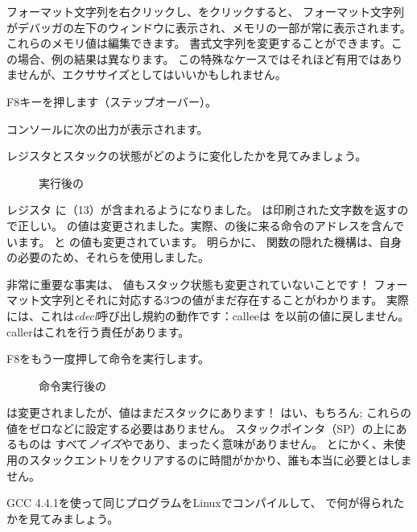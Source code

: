 フォーマット文字列を右クリックし、をクリックすると、
フォーマット文字列がデバッガの左下のウィンドウに表示され、メモリの一部が常に表示されます。 
これらのメモリ値は編集できます。 
書式文字列を変更することができます。この場合、例の結果は異なります。 
この特殊なケースではそれほど有用ではありませんが、エクササイズとしてはいいかもしれません。

\clearpage
F8キーを押します（ステップオーバー）。

コンソールに次の出力が表示されます。



レジスタとスタックの状態がどのように変化したかを見てみましょう。

\begin{figure}[H]
\centering
{}
\caption{\printf{} 実行後の \olly }
\label{fig:printf3_olly_3}
\end{figure}

レジスタ \EAX に（13）が含まれるようになりました。 
\printf は印刷された文字数を返すので正しい。 
\EIP の値は変更されました。実際、の後に来る命令のアドレスを含んでいます。 
\ECX と \EDX の値も変更されています。 
明らかに、 \printf 関数の隠れた機構は、自身の必要のため、それらを使用しました。

非常に重要な事実は、 \ESP 値もスタック状態も変更されていないことです！
フォーマット文字列とそれに対応する3つの値がまだ存在することがわかります。
実際には、これは\emph{cdecl}呼び出し規約の動作です：\gls{callee}は \ESP を以前の値に戻しません。 
\gls{caller}はこれを行う責任があります。

\clearpage
F8をもう一度押して命令を実行します。

\begin{figure}[H]
\centering
{}
\caption{命令実行後の \olly }
\label{fig:printf3_olly_4}
\end{figure}

\ESP は変更されましたが、値はまだスタックにあります！ 
はい、もちろん; これらの値をゼロなどに設定する必要はありません。 
スタックポインタ（\ac{SP}）の上にあるものは
すべて\emph{ノイズ}や\emph{\garbage{}}であり、まったく意味がありません。
とにかく、未使用のスタックエントリをクリアするのに時間がかかり、誰も本当に必要とはしません。

GCC 4.4.1を使って同じプログラムをLinuxでコンパイルして、 \IDA で何が得られたかを見てみましょう。

